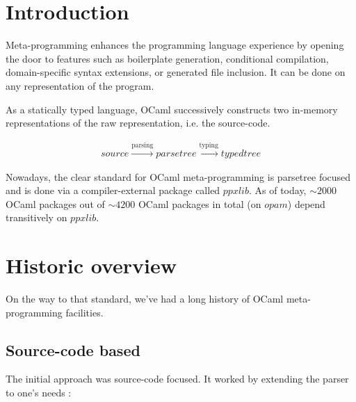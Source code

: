 \documentclass[10pt, a4paper, twocolumn]{article}
\begin{document}

\twocolumn[
  \begin{@twocolumnfalse}
    \maketitle
    \begin{abstract}
      \abstractText
      \newline
      \newline
    \end{abstract}
  \end{@twocolumnfalse}
]


\section{Introduction}
Meta-programming enhances the programming language experience by opening the
door to features such as boilerplate generation, conditional compilation,
domain-specific syntax extensions, or generated file inclusion. It can be done
on any representation of the program.

As a statically typed language, OCaml successively constructs two in-memory
representations of the raw representation, i.e. the source-code.

\begin{align*}
source \xrightarrow{\text{parsing}} parsetree \xrightarrow{\text{typing}} typedtree
\end{align*}

Nowadays, the clear standard for OCaml meta-programming is parsetree focused and
is done via a compiler-external package called $ppxlib$. As of today, $\sim2000$
OCaml packages out of $\sim4200$ OCaml packages in total (on $opam$) depend
transitively on $ppxlib$.

\section{Historic overview}

On the way to that standard, we've had a long history of OCaml meta-programming
facilities.


\subsection{Source-code based}

The initial approach was source-code focused. It worked by extending the parser
to one's needs \cite{camlp4}:
\end{document}
